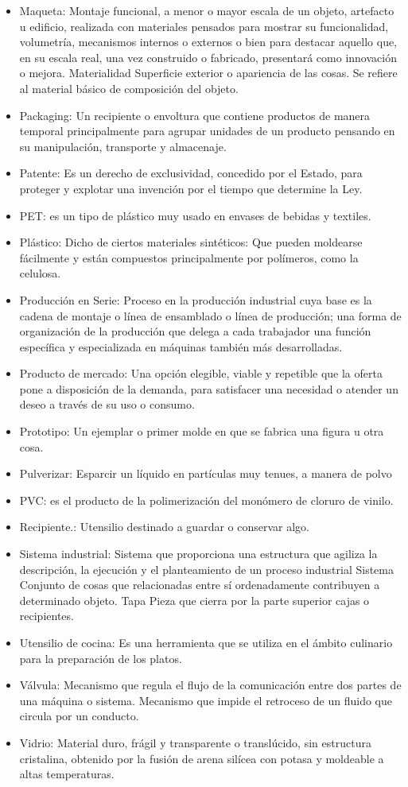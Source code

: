 \begin{itemize}
\item Maqueta:         	 Montaje funcional, a menor o mayor escala de un objeto, artefacto u edificio, realizada con materiales pensados para mostrar su funcionalidad, volumetría, mecanismos internos o externos o bien para destacar aquello que, en su escala real, una vez construido o fabricado, presentará como innovación o mejora.
Materialidad  	Superficie exterior o apariencia de las cosas. Se refiere al material básico de composición del objeto.
\item Packaging:       	Un recipiente o envoltura que contiene productos de manera temporal principalmente para agrupar unidades de un producto pensando en su manipulación, transporte y almacenaje.
\item Patente: Es un derecho de exclusividad, concedido por el Estado, para proteger y explotar una invención por el tiempo que determine la Ley.
\item PET:    	es un tipo de plástico muy usado en envases de bebidas y textiles.
\item Plástico: Dicho de ciertos materiales sintéticos: Que pueden moldearse fácilmente  y están compuestos principalmente por polímeros, como la celulosa.
\item Producción en Serie:    	Proceso en la producción industrial cuya base es la cadena de montaje o línea de ensamblado o línea de producción; una forma de organización de la producción que delega a cada trabajador una función específica y especializada en máquinas también más desarrolladas.
\item Producto de mercado:    Una opción elegible, viable y repetible que la oferta pone a disposición de la demanda, para satisfacer una necesidad o atender un deseo a través de su uso o consumo.
\item Prototipo:        	Un ejemplar o primer molde en que se fabrica una figura u otra cosa.
\item Pulverizar:       	Esparcir un líquido en partículas muy tenues, a manera de polvo
\item PVC:    	es el producto de la polimerización del monómero de cloruro de vinilo.
\item Recipiente.:    	Utensilio destinado a guardar o conservar algo.
\item Sistema industrial:        	Sistema que proporciona una estructura que agiliza la descripción, la ejecución y el planteamiento de un proceso industrial
Sistema Conjunto de cosas que relacionadas entre sí ordenadamente contribuyen a determinado objeto.
Tapa  	Pieza que cierra por la parte superior cajas o recipientes.
\item Utensilio de cocina:      	Es una herramienta que se utiliza en el ámbito culinario para la preparación de los platos.
\item Válvula: Mecanismo que regula el flujo de la comunicación entre dos partes de una máquina o sistema. Mecanismo que impide el retroceso de un fluido que circula por un conducto.
\item Vidrio:	Material duro, frágil y transparente o translúcido, sin estructura  cristalina, obtenido por la fusión de arena silícea con potasa y moldeable a altas temperaturas.
\end{itemize}
